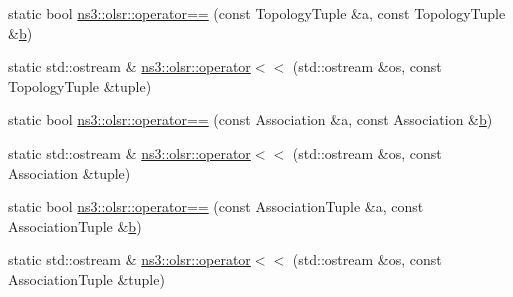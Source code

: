 \begin{DoxyCompactItemize}
\item 
static bool \hyperlink{namespacens3_1_1olsr_a5507536f7356edc181addaaf866399b4}{ns3\+::olsr\+::operator==} (const Topology\+Tuple \&a, const Topology\+Tuple \&\hyperlink{lte__pathloss_8m_a21ad0bd836b90d08f4cf640b4c298e7c}{b})
\item 
static std\+::ostream \& \hyperlink{namespacens3_1_1olsr_a0a1ac819b1ff2e5f2df91b9dc561befa}{ns3\+::olsr\+::operator$<$$<$} (std\+::ostream \&os, const Topology\+Tuple \&tuple)
\item 
static bool \hyperlink{namespacens3_1_1olsr_ac06abdb49923371148c79b2f3b1d343c}{ns3\+::olsr\+::operator==} (const Association \&a, const Association \&\hyperlink{lte__pathloss_8m_a21ad0bd836b90d08f4cf640b4c298e7c}{b})
\item 
static std\+::ostream \& \hyperlink{namespacens3_1_1olsr_a31338f4dd826a51db9bb65c392ad8464}{ns3\+::olsr\+::operator$<$$<$} (std\+::ostream \&os, const Association \&tuple)
\item 
static bool \hyperlink{namespacens3_1_1olsr_afd4fd578dd3936400b3254ce91a17b52}{ns3\+::olsr\+::operator==} (const Association\+Tuple \&a, const Association\+Tuple \&\hyperlink{lte__pathloss_8m_a21ad0bd836b90d08f4cf640b4c298e7c}{b})
\item 
static std\+::ostream \& \hyperlink{namespacens3_1_1olsr_a12320c1f6c81056233060ed207033632}{ns3\+::olsr\+::operator$<$$<$} (std\+::ostream \&os, const Association\+Tuple \&tuple)
\end{DoxyCompactItemize}
